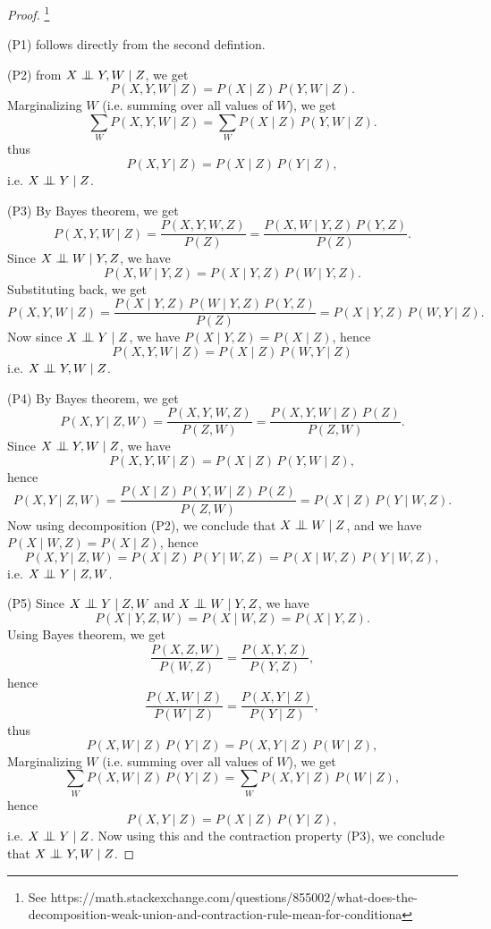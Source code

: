 \begin{proof}
\footnote{See
https://math.stackexchange.com/questions/855002/what-does-the-decomposition-weak-union-and-contraction-rule-mean-for-conditiona}

(P1) follows directly from the second defintion.

(P2) from $X\bigCI Y,W \mid Z$, we get
\[
  P(X,Y,W\mid Z) = P(X\mid Z) \, P(Y,W\mid Z).
\]
Marginalizing $W$ (i.e. summing over all values of $W$), we get
\[
  \sum_W P(X,Y,W\mid Z) = \sum_W P(X\mid Z) \, P(Y,W\mid Z).
\]
thus
\[
  P(X,Y\mid Z) = P(X\mid Z) \, P(Y\mid Z),
\]
i.e. $X\bigCI Y\mid Z$.

(P3) By Bayes theorem, we get 
\[
  P(X,Y,W\mid Z)=\frac{P(X,Y,W,Z)}{P(Z)}
    =\frac{P(X,W\mid Y,Z) \, P(Y,Z)}{P(Z)}.
\]
Since $X\bigCI W \mid Y,Z$, we have
\[
  P(X,W\mid Y,Z)=P(X\mid Y,Z)\, P(W\mid Y,Z).
\]
Substituting back, we get
\[
  P(X,Y,W\mid Z)=\frac{P(X\mid Y,Z)\, P(W\mid Y,Z)\, P(Y,Z)}{P(Z)}
                = P(X\mid Y,Z)\, P(W,Y\mid Z).
\]
Now since $X\bigCI Y \mid Z$, we have $P(X\mid Y,Z)=P(X\mid Z)$, hence
\[
  P(X,Y,W\mid Z)=P(X\mid Z)\, P(W,Y \mid Z)
\]
i.e. $X\bigCI Y,W\mid Z$.

(P4) By Bayes theorem, we get 
\[
  P(X,Y\mid Z,W)=\frac{P(X,Y,W,Z)}{P(Z,W)}
    =\frac{P(X,Y,W\mid Z) \, P(Z)}{P(Z,W)}.
\]
Since $X\bigCI Y,W\mid Z$, we have 
\[
  P(X,Y,W\mid Z)=P(X\mid Z)\, P(Y,W\mid Z),
\]
hence
\[
  P(X,Y\mid Z,W)=\frac{P(X\mid Z)\, P(Y,W\mid Z)\, P(Z)}{P(Z,W)}
                = P(X\mid Z)\, P(Y\mid W,Z).
\]
Now using decomposition (P2), we conclude that $X\bigCI W\mid Z$, and we have
$P(X\mid W,Z)=P(X\mid Z)$, hence
\[
  P(X,Y\mid Z,W)= P(X\mid Z)\, P(Y\mid W,Z)
                = P(X\mid W,Z)\, P(Y\mid W,Z),
\]
i.e. $X\bigCI Y\mid Z,W$.

(P5) Since $X\bigCI Y\mid Z,W$ and $X\bigCI W\mid Y,Z$, we have
\[
  P(X\mid Y,Z,W) = P(X\mid W,Z) = P(X\mid Y,Z).
\]
Using Bayes theorem, we get
\[
  \frac{P(X,Z,W)}{P(W,Z)} = \frac{P(X,Y,Z)}{P(Y,Z)},
\]
hence
\[
  \frac{P(X,W\mid Z)}{P(W\mid Z)} = \frac{P(X,Y\mid Z)}{P(Y\mid Z)},
\]
thus
\[
  P(X,W\mid Z)\, P(Y\mid Z) = P(X,Y\mid Z)\, P(W\mid Z),
\]
Marginalizing $W$ (i.e. summing over all values of $W$), we get
\[
  \sum_W P(X,W\mid Z)\, P(Y\mid Z) = \sum_W P(X,Y\mid Z)\, P(W\mid Z),
\]
hence
\[
  P(X,Y\mid Z) = P(X\mid Z)\, P(Y\mid Z),
\]
i.e. $X\bigCI Y\mid Z$.
Now using this and the contraction property (P3), we conclude that
$X\bigCI Y,W\mid Z$.
\end{proof}



